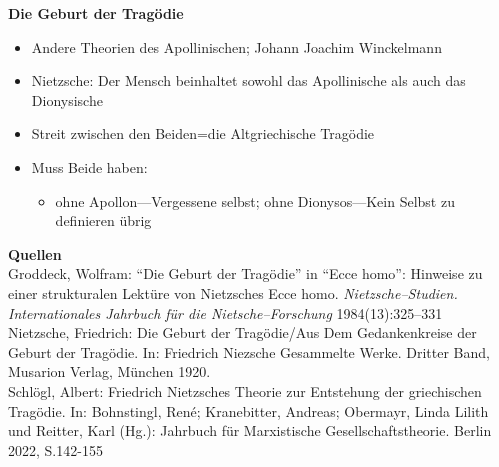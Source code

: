 \documentclass[12pt,a4paper]{article}
\begin{document}
\medskip\noindent\textbf{\Large Die Geburt der Tragödie}
\begin{itemize}    
    \item Andere Theorien des Apollinischen; Johann Joachim Winckelmann
    \item Nietzsche: Der Mensch beinhaltet sowohl das Apollinische als auch das Dionysische
    \item Streit zwischen den Beiden=die Altgriechische Tragödie
    \item Muss Beide haben: \begin{itemize}
                                \item ohne Apollon—Vergessene selbst; ohne Dionysos—Kein Selbst zu definieren übrig
                            \end{itemize}
\end{itemize}

\medskip\noindent\textbf{\Large Quellen}\\
{\small Groddeck, Wolfram: “Die Geburt der Tragödie” in “Ecce homo”: Hinweise zu einer strukturalen Lektüre von Nietzsches Ecce homo. \textit{Nietzsche–Studien. Internationales Jahrbuch für die Nietsche–Forschung} 1984(13):325–331\\Nietzsche, Friedrich: Die Geburt der Tragödie/Aus Dem Gedankenkreise der Geburt der Tragödie. In: Friedrich Niezsche Gesammelte Werke. Dritter Band, Musarion Verlag, München 1920.\\Schlögl, Albert: Friedrich Nietzsches Theorie zur Entstehung der griechischen Tragödie. In: Bohnstingl, Ren\'{e}; Kranebitter, Andreas; Obermayr, Linda Lilith und Reitter, Karl (Hg.): Jahrbuch für Marxistische Gesellschaftstheorie. Berlin 2022, S.142-155}
\end{document}
